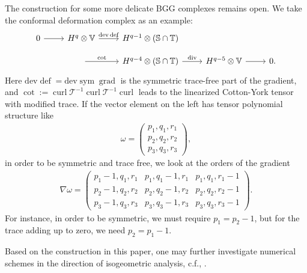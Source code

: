 \documentclass[final]{amsart}%
\newcommand{\0}{\mathaccent23}
\newcommand\sym{\operatorname{sym}}
\newcommand\grad{\operatorname{grad}}
\newcommand\deff{\operatorname{def}}
\renewcommand\div{\operatorname{div}}
\newcommand\curl{\operatorname{curl}}
\newcommand\dev{\mathrm{dev}}
\begin{document}
The construction for some more delicate BGG complexes remains open. We take the conformal deformation complex \cite[Equation (50)]{arnold2021complexes} as an example:
 \begin{equation}\label{conformal-deformation}
\begin{tikzcd}[row sep=small]
0 \arrow{r}&H^{q}\otimes \mathbb{V}\arrow{r}{\dev\deff} &H^{q-1}\otimes (\mathbb{S}\cap \mathbb{T}) \\& \arrow{r}{\cot} &H^{q-4}\otimes (\mathbb{S}\cap \mathbb{T}) \arrow{r}{\div} & H^{q-5}\otimes \mathbb{V} \arrow{r}{} & 0.
 \end{tikzcd}
\end{equation}
 Here $\dev\deff=\dev\sym\grad$ is the symmetric trace-free part of the gradient, and
 $\cot:={\curl  \mathcal{T}^{-1}\curl  \mathcal{T}^{-1}\curl}$ leads to the linearized Cotton-York tensor with modified trace. 
If the vector element on the left has tensor polynomial structure like
\begin{gather}
    \omega = \begin{pmatrix}
    p_1,q_1,r_1\\
    p_2,q_2,r_2\\
    p_3,q_3,r_3
    \end{pmatrix},
\end{gather}
in order to be symmetric and trace free, we look at the orders of the gradient
\begin{gather}
\nabla \omega =
    \begin{pmatrix}
    p_1-1,q_1,r_1 & p_1,q_1-1,r_1 & p_1,q_1,r_1-1\\
    p_2-1,q_2,r_2 & p_2,q_2-1,r_2 & p_2,q_2,r_2-1\\
    p_3-1,q_3,r_3 & p_3,q_3-1,r_3 & p_3,q_3,r_3-1
    \end{pmatrix}.
\end{gather}
For instance, in order to be symmetric, we must require $p_1 = p_2-1$, but for the trace adding up to zero, we need $p_2 = p_1-1$.
 
Based on the construction in this paper, one may further investigate numerical schemes in the direction of isogeometric analysis, c.f., \cite{arf2022mixed,evans2020hierarchical,kapidani2022high,zhang2018use}.

\appendix
\end{document}

